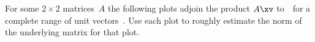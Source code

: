 \begin{exercise} \label{ex:} 
For some \(2\times2\) matrices~\(A\) the following plots adjoin the product \(A\xv\) to~\xv\ for a complete range of unit vectors~\xv.
Use each plot to roughly estimate the norm of the underlying matrix for that plot.
\begin{parts}
\item {}
\item {}
\item {}
\item {}
\item {}
\item {}
\end{parts}
\end{exercise}


